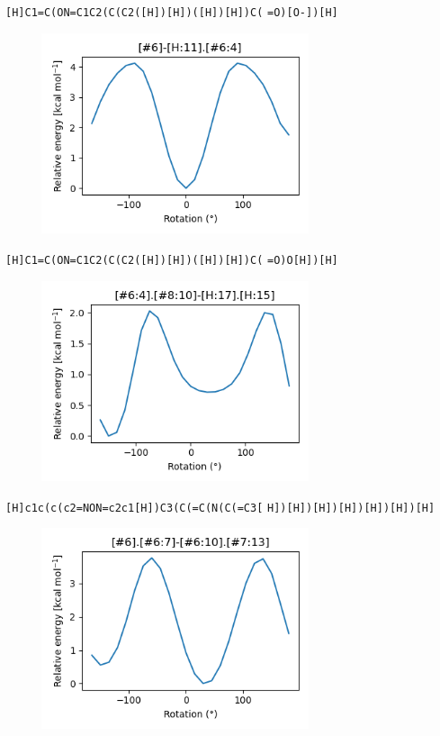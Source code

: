 \documentclass{beamer}
\begin{document}
\begin{frame}[fragile]
\verb|[H]C1=C(ON=C1C2(C(C2([H])[H])([H])[H])C(|
\verb|=O)[O-])[H]|

\begin{figure}
    \includegraphics[width=0.7\textwidth,height=0.7\textheight,keepaspectratio]{plot08.png}
\end{figure}
\end{frame}
\begin{frame}[fragile]
\verb|[H]C1=C(ON=C1C2(C(C2([H])[H])([H])[H])C(|
\verb|=O)O[H])[H]|

\begin{figure}
    \includegraphics[width=0.7\textwidth,height=0.7\textheight,keepaspectratio]{plot09.png}
\end{figure}
\end{frame}
\begin{frame}[fragile]
\verb|[H]c1c(c(c2=NON=c2c1[H])C3(C(=C(N(C(=C3[|
\verb|H])[H])[H])[H])[H])[H])[H]|

\begin{figure}
    \includegraphics[width=0.7\textwidth,height=0.7\textheight,keepaspectratio]{plot10.png}
\end{figure}
\end{frame}
\end{document}
